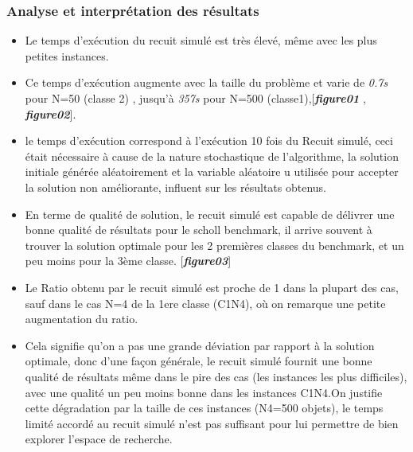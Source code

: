 \documentclass[12pt]{article}
\begin{document}
\subsubsection{Analyse et interprétation des résultats}
\begin{itemize}
    \item Le temps d’exécution du recuit simulé est très élevé, même avec les plus petites instances. 
    \item Ce temps d’exécution augmente avec la taille du problème et varie de \emph{0.7s} pour N=50 (classe 2) , jusqu’à \emph{357s} pour N=500 (classe1),[\textbf{\emph{figure01}} , \textbf{\emph{figure02}}].
    \item le temps d’exécution correspond à l’exécution 10 fois du Recuit simulé, ceci était nécessaire à cause de la nature stochastique de l’algorithme,  la solution initiale générée aléatoirement et la variable aléatoire u utilisée pour accepter la solution non améliorante, influent sur les résultats obtenus.
    \item En terme de qualité de solution, le recuit simulé est capable de délivrer une bonne qualité de résultats pour le scholl benchmark, il arrive souvent à trouver la solution optimale pour les 2 premières classes du benchmark, et un peu moins pour la 3ème classe. [\textbf{\emph{figure03}}]
    \item Le Ratio obtenu par le recuit simulé est proche de 1 dans la plupart des cas, sauf dans le cas N=4 de la 1ere classe (C1N4), où on remarque une petite augmentation du ratio. 
    \item Cela signifie qu’on a pas une grande déviation par rapport à la solution optimale, donc d’une façon générale, le recuit simulé fournit une bonne qualité de résultats même dans le pire des cas (les instances les plus difficiles), avec une qualité un peu moins bonne dans les instances C1N4.On justifie cette dégradation par la taille de ces instances (N4=500 objets), le temps limité accordé au recuit simulé n’est pas suffisant pour lui permettre de bien explorer l’espace de recherche. 

\end{itemize}
\end{document}
